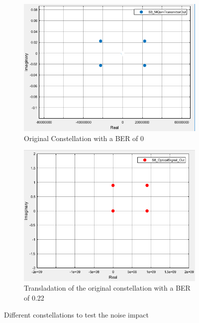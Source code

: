 \begin{figure}[H]
	\centering
	\begin{subfigure}{0.4\textwidth}
		\centering
		\includegraphics[scale=0.5]{./lib/m_qam_transmitter/figures/constellation_og.png}
		\caption{Original Constellation with a BER of 0}
		\label{fig:const_og}
	\end{subfigure}
	\begin{subfigure}{.4\textwidth}
		\centering
		\includegraphics[scale=0.45]{./lib/m_qam_transmitter/figures/constellation2.png}
		\caption{Transladation of the original constellation with a BER of 0.22}
		\label{fig:const_new}
	\end{subfigure}
	\caption{Different constellations to test the noise impact}
	\label{fig:Constellations}
\end{figure}
